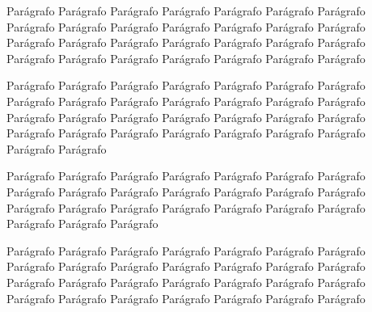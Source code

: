 Parágrafo Parágrafo Parágrafo Parágrafo Parágrafo Parágrafo Parágrafo Parágrafo Parágrafo Parágrafo Parágrafo Parágrafo Parágrafo Parágrafo Parágrafo Parágrafo Parágrafo Parágrafo Parágrafo Parágrafo Parágrafo Parágrafo Parágrafo Parágrafo Parágrafo Parágrafo Parágrafo Parágrafo

Parágrafo Parágrafo Parágrafo Parágrafo Parágrafo Parágrafo Parágrafo Parágrafo Parágrafo Parágrafo Parágrafo Parágrafo Parágrafo Parágrafo Parágrafo Parágrafo Parágrafo Parágrafo Parágrafo Parágrafo Parágrafo Parágrafo Parágrafo Parágrafo Parágrafo Parágrafo Parágrafo Parágrafo Parágrafo Parágrafo 

Parágrafo Parágrafo Parágrafo Parágrafo Parágrafo Parágrafo Parágrafo Parágrafo Parágrafo Parágrafo Parágrafo Parágrafo Parágrafo Parágrafo Parágrafo Parágrafo Parágrafo Parágrafo Parágrafo Parágrafo Parágrafo Parágrafo Parágrafo Parágrafo 

Parágrafo Parágrafo Parágrafo Parágrafo Parágrafo Parágrafo Parágrafo Parágrafo Parágrafo Parágrafo Parágrafo Parágrafo Parágrafo Parágrafo Parágrafo Parágrafo Parágrafo Parágrafo Parágrafo Parágrafo Parágrafo Parágrafo Parágrafo Parágrafo Parágrafo Parágrafo Parágrafo Parágrafo

